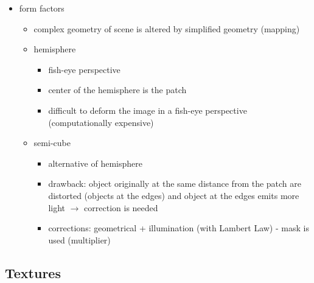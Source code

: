 \documentclass{standalone}
\begin{document}
\begin{itemize}
		\item form factors
			\begin{itemize}
				\item complex geometry of scene is altered by simplified geometry (mapping)
				\item hemisphere
					\begin{itemize}
						\item fish-eye perspective
						\item center of the hemisphere is the patch 
						\item difficult to deform the image in a fish-eye perspective (computationally expensive)
					\end{itemize} 
				\item semi-cube
					\begin{itemize}
						\item alternative of hemisphere 
						\item drawback: object originally at the same distance from the patch are distorted (objects at the edges) and object at the edges emits more light $\rightarrow$ correction is needed
						\item corrections: geometrical + illumination (with Lambert Law) - mask is used (multiplier)
					\end{itemize}
			\end{itemize}
\end{itemize}

\subsection{Textures}
\end{document}
